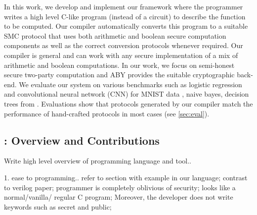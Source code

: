 In this work, we develop and implement our framework \tool where the programmer writes a high level C-like program (instead of a circuit) to describe the function to be computed. Our compiler automatically converts this program to a suitable SMC protocol that uses both arithmetic and boolean secure computation components as well as the correct conversion protocols whenever required. Our compiler is general and can work with any secure implementation of a mix of arithmetic and boolean computations. In our work, we focus on semi-honest secure two-party computation and  ABY \cite{aby} provides the suitable cryptographic back-end.  We evaluate our system on various benchmarks such as logistic regression and convolutional neural network (CNN) for MNIST data \cite{minionn}, naive bayes, decision trees from \cite{shafindss}. Evaluations show that protocols generated by our compiler match the performance of hand-crafted protocols in most cases (see \ref{sec:eval}). 


\subsection{\tool: Overview and Contributions} Write high level overview of programming language and tool..

1. ease to programming.. refer to section with example in our language; contrast to verilog paper; programmer is completely oblivious of security; looks like a normal/vanilla/ regular C program;
Moreover, the developer does not write keywords such as secret and public; 



